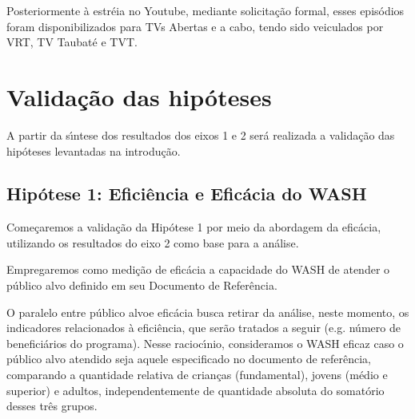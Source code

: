 \documentclass[
12pt,		%
openright,	%
twoside,  %
a4paper,			%
chapter=TITLE,		%
english,			%
french,				%
spanish,			%
brazil				%
]{USPSC-classe/USPSC}
\begin{document}
Posteriormente \`a estr\'eia no Youtube, mediante solicita\c{c}\~ao formal, esses epis\'odios foram disponibilizados para TVs Abertas e \textquotedbl a cabo\textquotedbl , tendo sido veiculados por VRT, TV Taubat\'e e TVT.








\section[Valida\c{c}\~ao das hip\'oteses]{Valida\c{c}\~ao das hip\'oteses}\label{Valida\c{c}\~ao das hip\'oteses}
A partir da s\'{\i}ntese dos resultados  dos eixos 1 e 2 ser\'a realizada  a valida\c{c}\~ao das hip\'oteses levantadas na introdu\c{c}\~ao.








\subsection[Hip\'otese 1: Efici\^encia e Efic\'acia do WASH]{Hip\'otese 1: Efici\^encia e Efic\'acia do WASH}\label{Hip\'otese 1: Efici\^encia e Efic\'acia do WASH}
Come\c{c}aremos a valida\c{c}\~ao da Hip\'otese 1 por meio da abordagem da efic\'acia, utilizando os resultados do eixo 2 como base para a an\'alise.








Empregaremos como  medi\c{c}\~ao de efic\'acia a capacidade do WASH de atender o p\'ublico alvo definido em seu Documento de Refer\^encia.








O paralelo entre \textquotedbl p\'ublico alvo\textquotedbl  e efic\'acia busca retirar da an\'alise, neste momento, os indicadores relacionados \`a efici\^encia, que ser\~ao tratados a seguir (e.g. n\'umero de benefici\'arios do programa). Nesse racioc\'{\i}nio, consideramos o WASH eficaz caso o p\'ublico alvo atendido seja aquele especificado no documento de refer\^encia, comparando a quantidade relativa de crian\c{c}as (fundamental), jovens (m\'edio e superior) e adultos, independentemente de quantidade absoluta do somat\'orio desses tr\^es grupos.
\end{document}
